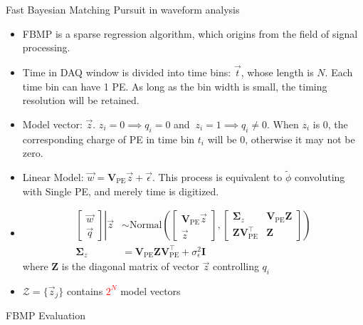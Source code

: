 \documentclass[final]{beamer}
\newlength{\colwidth}
\begin{document}
\begin{frame}[t]
\begin{columns}[t]
\begin{column}{\colwidth}
\begin{block}{Fast Bayesian Matching Pursuit\cite{schniter_fast_nodate} in waveform analysis}
    \begin{itemize}
      \item FBMP is a sparse regression algorithm, which origins from the field of signal processing. 
      \item Time in DAQ window is divided into time bins: $\vec{t}$, whose length is $N$. Each time bin can have 1 PE. As long as the bin width is small, the timing resolution will be retained. 
      \item Model vector: $\vec{z}$. $z_i=0\implies q_i=0$ and $\ z_i=1\implies q_i\neq0$. When $z_i$ is 0, the corresponding charge of PE in time bin $t_i$ will be 0, otherwise it may not be zero. 
      \item Linear Model: $\vec{w} = \bm{V}_\mathrm{PE}\vec{z} + \vec{\epsilon}$. This process is equivalent to $\tilde{\phi}$ convoluting with Single PE, and merely time is digitized. 
      \item 
          \begin{align*}
              \left.
              \begin{bmatrix}
                  \vec{w} \\
                  \vec{q}
              \end{bmatrix}
              \right\vert\vec{z}
              &\sim \mathrm{Normal}\left(
              \begin{bmatrix}
                  \bm{V}_\mathrm{PE}\vec{z} \\
                  \vec{z}
              \end{bmatrix}, 
              \begin{bmatrix}
                  \bm{\Sigma}_z & \bm{V}_\mathrm{PE}\bm{Z} \\
                  \bm{Z}\bm{V}_\mathrm{PE}^\intercal & \bm{Z}
              \end{bmatrix}
              \right) \\
              \bm{\Sigma}_z &= \bm{V}_\mathrm{PE}\bm{Z}\bm{V}_\mathrm{PE}^\intercal+\sigma_\epsilon^2\bm{I}
          \end{align*}
        where $\bm{Z}$ is the diagonal matrix of vector $\vec{z}$ controlling $q_i$ 
        \item $\mathcal{Z}=\{\vec{z}_j\}$ contains \textcolor{red}{$2^{N}$} model vectors
    \end{itemize}

  \end{block}

  \begin{block}{FBMP Evaluation}


\end{block}
\end{column}
\end{columns}
\end{frame}
\end{document}
